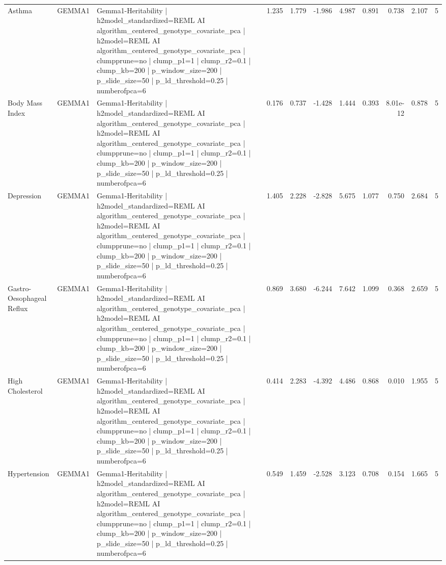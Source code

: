 \begin{landscape}
\begin{longtable}{p{2.4cm}p{1.8cm}p{6.0cm}rrrrrrrr}
Asthma & GEMMA1 & Gemma1-Heritability | h2model\_standardized=REML AI algorithm\_centered\_genotype\_covariate\_pca | h2model=REML AI algorithm\_centered\_genotype\_covariate\_pca | clumpprune=no | clump\_p1=1 | clump\_r2=0.1 | clump\_kb=200 | p\_window\_size=200 | p\_slide\_size=50 | p\_ld\_threshold=0.25 | numberofpca=6 & 1.235 & 1.779 & -1.986 & 4.987 & 0.891 & 0.738 & 2.107 & 5 \\
Body Mass Index & GEMMA1 & Gemma1-Heritability | h2model\_standardized=REML AI algorithm\_centered\_genotype\_covariate\_pca | h2model=REML AI algorithm\_centered\_genotype\_covariate\_pca | clumpprune=no | clump\_p1=1 | clump\_r2=0.1 | clump\_kb=200 | p\_window\_size=200 | p\_slide\_size=50 | p\_ld\_threshold=0.25 | numberofpca=6 & 0.176 & 0.737 & -1.428 & 1.444 & 0.393 & 8.01e-12 & 0.878 & 5 \\
Depression & GEMMA1 & Gemma1-Heritability | h2model\_standardized=REML AI algorithm\_centered\_genotype\_covariate\_pca | h2model=REML AI algorithm\_centered\_genotype\_covariate\_pca | clumpprune=no | clump\_p1=1 | clump\_r2=0.1 | clump\_kb=200 | p\_window\_size=200 | p\_slide\_size=50 | p\_ld\_threshold=0.25 | numberofpca=6 & 1.405 & 2.228 & -2.828 & 5.675 & 1.077 & 0.750 & 2.684 & 5 \\
Gastro-Oesophageal Reflux & GEMMA1 & Gemma1-Heritability | h2model\_standardized=REML AI algorithm\_centered\_genotype\_covariate\_pca | h2model=REML AI algorithm\_centered\_genotype\_covariate\_pca | clumpprune=no | clump\_p1=1 | clump\_r2=0.1 | clump\_kb=200 | p\_window\_size=200 | p\_slide\_size=50 | p\_ld\_threshold=0.25 | numberofpca=6 & 0.869 & 3.680 & -6.244 & 7.642 & 1.099 & 0.368 & 2.659 & 5 \\
High Cholesterol & GEMMA1 & Gemma1-Heritability | h2model\_standardized=REML AI algorithm\_centered\_genotype\_covariate\_pca | h2model=REML AI algorithm\_centered\_genotype\_covariate\_pca | clumpprune=no | clump\_p1=1 | clump\_r2=0.1 | clump\_kb=200 | p\_window\_size=200 | p\_slide\_size=50 | p\_ld\_threshold=0.25 | numberofpca=6 & 0.414 & 2.283 & -4.392 & 4.486 & 0.868 & 0.010 & 1.955 & 5 \\
Hypertension & GEMMA1 & Gemma1-Heritability | h2model\_standardized=REML AI algorithm\_centered\_genotype\_covariate\_pca | h2model=REML AI algorithm\_centered\_genotype\_covariate\_pca | clumpprune=no | clump\_p1=1 | clump\_r2=0.1 | clump\_kb=200 | p\_window\_size=200 | p\_slide\_size=50 | p\_ld\_threshold=0.25 | numberofpca=6 & 0.549 & 1.459 & -2.528 & 3.123 & 0.708 & 0.154 & 1.665 & 5 \\

\end{longtable}
\end{landscape}
